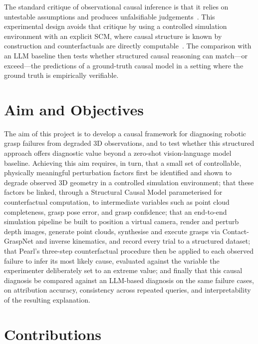 \documentclass[11pt,a4paper]{report}
\begin{document}
The standard critique of observational causal inference is that it relies on untestable assumptions and produces unfalsifiable judgements~\cite{cox2025necessary}. This experimental design avoids that critique by using a controlled simulation environment with an explicit SCM, where causal structure is known by construction
and counterfactuals are directly computable~\cite{pearl2009causality}. The comparison with an LLM baseline then tests whether structured causal reasoning can match---or exceed---the predictions of a ground-truth causal model in a setting where the ground truth is empirically verifiable.

\section{Aim and Objectives}
\label{sec:aims}

The aim of this project is to develop a causal framework for diagnosing robotic grasp failures from degraded 3D observations, and to test whether this structured approach offers diagnostic value beyond a zero-shot vision-language model baseline. Achieving this aim requires, in turn, that a small set of controllable, physically meaningful perturbation factors first be identified and shown to degrade observed 3D geometry in a controlled simulation environment; that these factors be linked, through a Structural Causal Model parameterised for counterfactual computation, to intermediate variables such as point cloud completeness, grasp pose error, and grasp confidence; that an end-to-end simulation pipeline be built to position a virtual camera, render and perturb depth images, generate point clouds, synthesise and execute grasps via Contact-GraspNet and inverse kinematics, and record every trial to a structured dataset; that Pearl's three-step counterfactual procedure then be applied to each observed failure to infer its most likely cause, evaluated against the variable the experimenter deliberately set to an extreme value; and finally that this causal diagnosis be compared against an LLM-based diagnosis on the same failure cases, on attribution accuracy, consistency across repeated queries, and interpretability of the resulting explanation.

\section{Contributions}
\label{sec:contributions}
\end{document}
